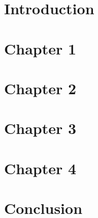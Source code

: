 \documentclass[11pt]{article}
\begin{document}
\renewcommand{\tablename}{Table}

\thispagestyle{empty}


\newpage
{}



\newpage


\tableofcontents
\newpage



\renewcommand{\listfigurename}{List of Figures}
\listoffigures
\newpage


\renewcommand{\listtablename}{List of Tables} 
\listoftables
\newpage




\section{Introduction}\label{sec:introduction}

\newpage

\section{Chapter 1}\label{sec:chap1}
  
  \newpage

\section{Chapter 2}\label{sec:chap2}
  
  \newpage

  \section{Chapter 3}\label{sec:chap3}
  
  \newpage

  \section{Chapter 4}\label{sec:chap4}
  
  \newpage

  \section{Conclusion}\label{sec:chap2}
  
  \newpage

%

	
\end{document}
